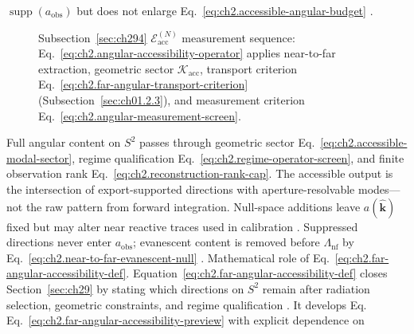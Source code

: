 \(\operatorname{supp}(a_{\mathrm{obs}})\) but does not enlarge
Eq.~\eqref{eq:ch2.accessible-angular-budget} \cite{stratton1941}.
\begin{figure}[t]
\centering
{}
\caption{Subsection~\ref{sec:ch294} $\mathcal{E}_{\mathrm{acc}}^{(N)}$ measurement sequence:
Eq.~\eqref{eq:ch2.angular-accessibility-operator} applies near-to-far extraction, geometric
sector \(\mathcal{K}_{\mathrm{acc}}\), transport criterion Eq.~\eqref{eq:ch2.far-angular-transport-criterion}
(Subsection~\ref{sec:ch01.2.3}), and measurement criterion
Eq.~\eqref{eq:ch2.angular-measurement-screen}.}
\label{fig:ch2.far-angular-accessibility-pipeline}
\end{figure}
Full angular content on $S^{2}$ passes through geometric sector Eq.~\eqref{eq:ch2.accessible-modal-sector}, regime qualification Eq.~\eqref{eq:ch2.regime-operator-screen}, and finite observation rank Eq.~\eqref{eq:ch2.reconstruction-rank-cap}. The accessible output is the intersection of export-supported directions with aperture-resolvable modes---not the raw pattern from forward integration. Null-space additions leave $a(\widehat{\mathbf{k}})$ fixed but may alter near reactive traces used in calibration \cite{stratton1941}. Suppressed directions never enter \(a_{\mathrm{obs}}\); evanescent content is removed before
\(\Lambda_{\mathrm{nf}}\) by Eq.~\eqref{eq:ch2.near-to-far-evanescent-null}
\cite{stratton1941}.
Mathematical role of Eq.~\eqref{eq:ch2.far-angular-accessibility-def}. Equation~\eqref{eq:ch2.far-angular-accessibility-def} closes Section~\ref{sec:ch29} by stating
which directions on \(S^{2}\) remain after radiation selection, geometric constraints, and
regime qualification \cite{stratton1941}. It develops Eq.
Eq.~\eqref{eq:ch2.far-angular-accessibility-preview} with explicit dependence on

